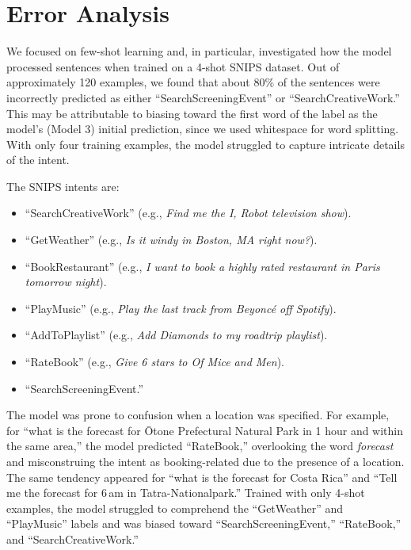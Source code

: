 \documentclass[11pt]{article}
\begin{document}
\section{Error Analysis}

We focused on few-shot learning and, in particular, investigated how the
model processed sentences when trained on a 4-shot SNIPS dataset. Out of
approximately 120 examples, we found that about 80\% of the sentences were
incorrectly predicted as either
``SearchScreeningEvent'' or ``SearchCreativeWork.'' This may be attributable
to biasing toward the first word of the label as the model's (Model 3)
initial prediction, since we used whitespace for word splitting. With only
four training examples, the model struggled to capture intricate details of
the intent.

The SNIPS intents are:
\begin{itemize}
  \item ``SearchCreativeWork'' (e.g., \emph{Find me the I, Robot television
        show}).
  \item ``GetWeather'' (e.g., \emph{Is it windy in Boston, MA right now?}).
  \item ``BookRestaurant'' (e.g., \emph{I want to book a highly rated
        restaurant in Paris tomorrow night}).
  \item ``PlayMusic'' (e.g., \emph{Play the last track from Beyonc\'e off
        Spotify}).
  \item ``AddToPlaylist'' (e.g., \emph{Add Diamonds to my roadtrip
        playlist}).
  \item ``RateBook'' (e.g., \emph{Give 6 stars to Of Mice and Men}).
  \item ``SearchScreeningEvent.''
\end{itemize}

The model was prone to confusion when a location was specified. For example,
for ``what is the forecast for \=Otone Prefectural Natural Park in 1 hour and
within the same area,'' the model predicted ``RateBook,'' overlooking the
word \emph{forecast} and misconstruing the intent as booking-related due to
the presence of a location. The same tendency appeared for ``what is the
forecast for Costa Rica'' and ``Tell me the forecast for 6\,am in
Tatra-Nationalpark.'' Trained with only 4-shot examples, the model struggled
to comprehend the ``GetWeather'' and ``PlayMusic'' labels and was biased
toward ``SearchScreeningEvent,'' ``RateBook,'' and ``SearchCreativeWork.''
\end{document}
